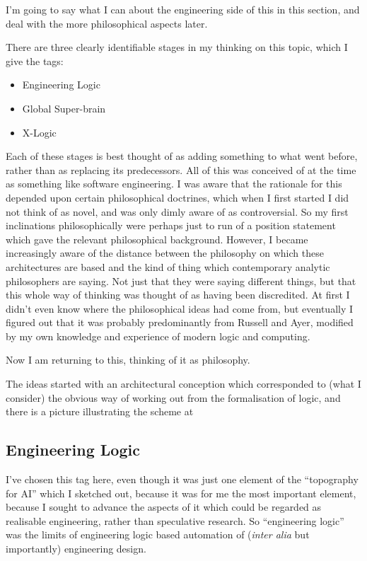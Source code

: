 I'm going to say what I can about the engineering side of this in this section, and deal with the more philosophical aspects later.

There are three clearly identifiable stages in my thinking on this topic, which I give the tags:

\begin{itemize}
\item Engineering Logic
\item Global Super-brain
\item X-Logic
\end{itemize}

Each of these stages is best thought of as adding something to what went before, rather than as replacing its predecessors.
All of this was conceived of at the time as something like software engineering.
I was aware that the rationale for this depended upon certain philosophical doctrines, which when I first started I did not think of as novel, and was only dimly aware of as controversial.
So my first inclinations philosophically were perhaps just to run of a position statement which gave the relevant philosophical background.
However, I became increasingly aware of the distance between the philosophy on which these architectures are based and the kind of thing which contemporary analytic philosophers are saying.
Not just that they were saying different things, but that this whole way of thinking was thought of as having been discredited.
At first I didn't even know where the philosophical ideas had come from, but eventually I figured out that it was probably predominantly from Russell and Ayer, modified by my own knowledge and experience of modern logic and computing.

Now I am returning to this, thinking of it as philosophy.

The ideas started with an architectural conception which corresponded to (what I consider) the obvious way of working out from the formalisation of logic, and there is a picture illustrating the scheme at 

\subsection{Engineering Logic}

I've chosen this tag here, even though it was just one element of the ``topography for AI'' which I sketched out, because it was for me the most important element, because I sought to advance the aspects of it which could be regarded as realisable engineering, rather than speculative research.
So ``engineering logic'' was the limits of engineering logic based automation of ({\it inter alia} but importantly) engineering design.

